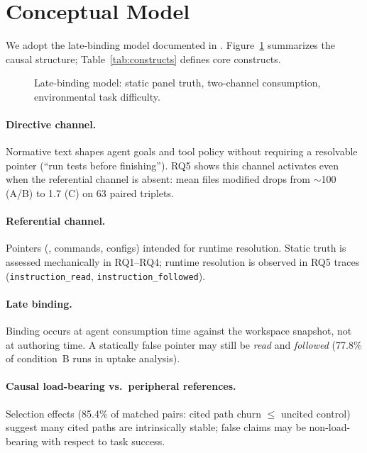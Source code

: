 \section{Conceptual Model}
\label{sec:model}

We adopt the late-binding model documented in .
Figure~\ref{fig:model-dag} summarizes the causal structure; Table~\ref{tab:constructs} defines core constructs.

\begin{figure}[t]
  \centering
  \caption{Late-binding model: static panel truth, two-channel consumption, environmental task difficulty.}
  \label{fig:model-dag}
\end{figure}

\begin{table}[t]
  \caption{Core constructs in the late-binding model.}
  \label{tab:constructs}
  
\end{table}

\paragraph{Directive channel.}
Normative text shapes agent goals and tool policy without requiring a resolvable pointer (\eg ``run tests before finishing'').
RQ5 shows this channel activates even when the referential channel is absent: mean files modified drops from $\sim$100 (A/B) to 1.7 (C) on 63 paired triplets.

\paragraph{Referential channel.}
Pointers (\paths, commands, configs) intended for runtime resolution.
Static truth is assessed mechanically in RQ1--RQ4; runtime resolution is observed in RQ5 traces (\texttt{instruction\_read}, \texttt{instruction\_followed}).

\paragraph{Late binding.}
Binding occurs at agent consumption time against the workspace snapshot, not at authoring time.
A statically false pointer may still be \emph{read} and \emph{followed} (77.8\% of condition~B runs in uptake analysis).

\paragraph{Causal load-bearing vs.\ peripheral references.}
Selection effects (85.4\% of matched pairs: cited path churn $\leq$ uncited control) suggest many cited paths are intrinsically stable; false claims may be non-load-bearing with respect to task success.
